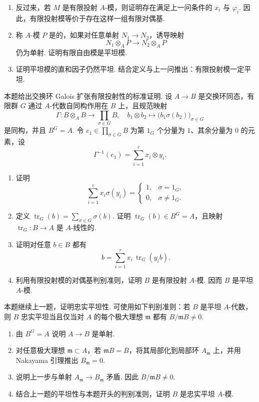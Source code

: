 \begin{exercise}
\begin{exgroup}
\begin{enumerate}
            \item 反过来，若 $M$ 是有限投射 $A$-模，则证明存在满足上一问条件的 $x_i$ 与 $\varphi_i$. 因此，有限投射模等价于存在这样一组有限对偶基.
            \item 称 $A$-模 $P$ 是的，如果对任意单射 $N_1\to N_2$，诱导映射
            \[
                N_1\otimes_A P\to N_2\otimes_A P
            \]
            仍为单射. 证明有限自由模是平坦模.
            \item 证明平坦模的直和因子仍然平坦. 结合定义与上一问推出：有限投射模一定平坦.
        \end{enumerate}
        \item 本题给出交换环 Galois 扩张有限投射性的标准证明. 设 $A\to B$ 是交换环同态，有限群 $G$ 通过 $A$-代数自同构作用在 $B$ 上，且规范映射
        \[
            \Gamma\colon B\otimes_A B\to\prod_{\sigma\in G}B,\quad
            b_1\otimes b_2\mapsto\bigl(b_1\sigma(b_2)\bigr)_{\sigma\in G}
        \]
        是同构，并且 $B^G=A$. 令 $e_1\in\prod_{\sigma\in G}B$ 为第 $1_G$ 个分量为 $1$、其余分量为 $0$ 的元素，设
        \[
            \Gamma^{-1}(e_1)=\sum_{i=1}^r x_i\otimes y_i.
        \]
        \begin{enumerate}
            \item 证明
            \[
                \sum_{i=1}^r x_i\sigma(y_i)=
                \begin{cases}
                    1,&\sigma=1_G,\\
                    0,&\sigma\neq1_G.
                \end{cases}
            \]
            \item 定义 $\operatorname{tr}_G(b)=\sum_{\sigma\in G}\sigma(b)$. 证明 $\operatorname{tr}_G(b)\in B^G=A$，且映射 $\operatorname{tr}_G\colon B\to A$ 是 $A$-线性的.
            \item 证明对任意 $b\in B$ 都有
            \[
                b=\sum_{i=1}^r x_i\,\operatorname{tr}_G(y_i b).
            \]
            \item 利用有限投射模的对偶基判别准则，证明 $B$ 是有限投射 $A$-模. 因而 $B$ 是平坦 $A$-模.
        \end{enumerate}
        \item 本题继续上一题，证明忠实平坦性. 可使用如下判别准则：若 $B$ 是平坦 $A$-代数，则 $B$ 忠实平坦当且仅当对 $A$ 的每个极大理想 $\mathfrak{m}$ 都有 $B/\mathfrak{m}B\neq0$.
        \begin{enumerate}
            \item 由 $B^G=A$ 说明 $A\to B$ 是单射.
            \item 对任意极大理想 $\mathfrak{m}\subset A$，若 $\mathfrak{m}B=B$，将其局部化到局部环 $A_{\mathfrak{m}}$ 上，并用 Nakayama 引理推出 $B_{\mathfrak{m}}=0$.
            \item 说明上一步与单射 $A_{\mathfrak{m}}\to B_{\mathfrak{m}}$ 矛盾. 因此 $B/\mathfrak{m}B\neq0$.
            \item 结合上一题的平坦性与本题开头的判别准则，证明 $B$ 是忠实平坦 $A$-模.
        \end{enumerate}
    \end{exgroup}
\end{exercise}

